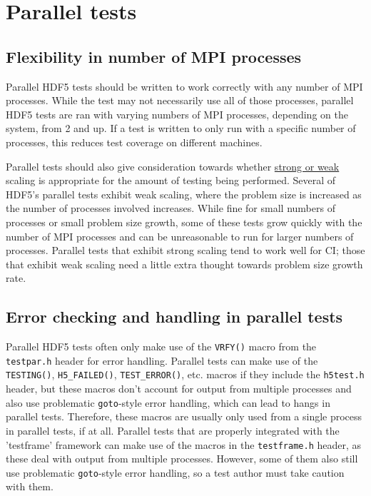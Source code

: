 \documentclass[../HDF5_RFC.tex]{subfiles}
\begin{document}
\section{Parallel tests}
\label{parallel}

\subsection{Flexibility in number of MPI processes}

Parallel HDF5 tests should be written to work correctly with any number of MPI processes. While the
test may not necessarily use all of those processes, parallel HDF5 tests are ran with varying numbers
of MPI processes, depending on the system, from 2 and up. If a test is written to only run with a
specific number of processes, this reduces test coverage on different machines.

Parallel tests should also give consideration towards whether
\href{https://hpc-wiki.info/hpc/Scaling#Strong_or_Weak_Scaling}{strong or weak} scaling is appropriate
for the amount of testing being performed. Several of HDF5's parallel tests exhibit weak scaling, where
the problem size is increased as the number of processes involved increases. While fine for small
numbers of processes or small problem size growth, some of these tests grow quickly with the number of
MPI processes and can be unreasonable to run for larger numbers of processes. Parallel tests that
exhibit strong scaling tend to work well for CI; those that exhibit weak scaling need a little extra
thought towards problem size growth rate.

\subsection{Error checking and handling in parallel tests}

Parallel HDF5 tests often only make use of the \texttt{VRFY()} macro from the \texttt{testpar.h} header
for error handling. Parallel tests can make use of the \texttt{TESTING()}, \texttt{H5\_FAILED()},
\texttt{TEST\_ERROR()}, etc. macros if they include the \texttt{h5test.h} header, but these macros
don't account for output from multiple processes and also use problematic \texttt{goto}-style error
handling, which can lead to hangs in parallel tests. Therefore, these macros are usually only used
from a single process in parallel tests, if at all. Parallel tests that are properly integrated with
the 'testframe' framework can make use of the macros in the \texttt{testframe.h} header, as these
deal with output from multiple processes. However, some of them also still use problematic
\texttt{goto}-style error handling, so a test author must take caution with them.
\end{document}
